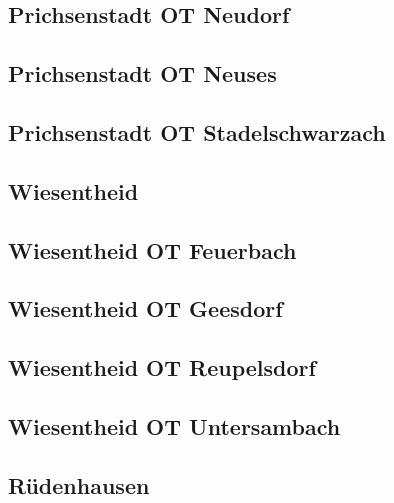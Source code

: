 \documentclass[fontsize=12pt,a4paper]{scrreprt}
\begin{document}
            \subsection{Prichsenstadt OT Neudorf}
            
            
            \subsection{Prichsenstadt OT Neuses}
            

            \subsection{Prichsenstadt OT Stadelschwarzach}
            

            \subsection{Wiesentheid}
            

            \subsection{Wiesentheid OT Feuerbach}
            

            \subsection{Wiesentheid OT Geesdorf}
            

            \subsection{Wiesentheid OT Reupelsdorf}
            

            \subsection{Wiesentheid OT Untersambach}
            

            \subsection{Rüdenhausen}
            
\end{document}

